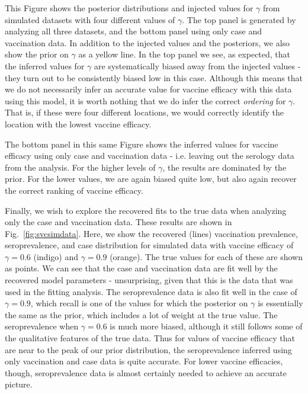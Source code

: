 \documentclass[nofootinbib,aps,pre,twocolumn,superscriptaddress,showkeys,showpacs]{revtex4-1}
\begin{document}
This Figure shows the posterior distributions and injected values for $\gamma$ from simulated datasets with four different values of $\gamma$. The top panel is generated by analyzing all three datasets, and the bottom panel using only case and vaccination data. In addition to the injected values and the posteriors, we also show the prior on $\gamma$ as a yellow line. In the top panel we see, as expected, that the inferred values for $\gamma$ are systematically biased away from the injected values - they turn out to be consistently biased low in this case. Although this means that we do not necessarily infer an accurate value for vaccine efficacy with this data using this model, it is worth nothing that we do infer the correct \emph{ordering} for $\gamma$. That is, if these were four different locations, we would correctly identify the location with the lowest vaccine efficacy.

The bottom panel in this same Figure shows the inferred values for vaccine efficacy using only case and vaccination data - i.e. leaving out the serology data from the analysis. For the higher levels of $\gamma$, the results are dominated by the prior. For the lower values, we are again biased quite low, but also again recover the correct ranking of vaccine efficacy.

Finally, we wish to explore the recovered fits to the true data when analyzing only the case and vaccination data. These results are shown in Fig.~\ref{fig:svcsimdata}. Here, we show the recovered (lines) vaccination prevalence, seroprevalence, and case distribution for simulated data with vaccine efficacy of $\gamma = 0.6$ (indigo) and $\gamma = 0.9$ (orange). The true values for each of these are shown as points. We can see that the case and vaccination data are fit well by the recovered model parameters - unsurprising, given that this is the data that was used in the fitting analysis. The seroprevalence data is also fit well in the case of $\gamma = 0.9$, which recall is one of the values for which the posterior on $\gamma$ is essentially the same as the prior, which includes a lot of weight at the true value. The seroprevalence when $\gamma = 0.6$ is much more biased, although it still follows some of the qualitative features of the true data. Thus for values of vaccine efficacy that are near to the peak of our prior distribution, the seroprevalence inferred using only vaccination and case data is quite accurate. For lower vaccine efficacies, though, seroprevalence data is almost certainly needed to achieve an accurate picture.
\end{document}
